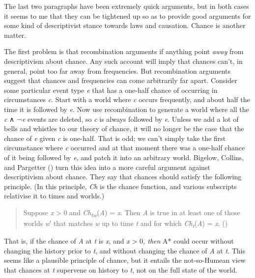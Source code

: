 \documentclass[
  11pt,
  letterpaper,
  DIV=11,
  numbers=noendperiod,
  twoside]{scrartcl}
\begin{document}
The last two paragraphs have been extremely quick arguments, but in both
cases it seems to me that they can be tightened up so as to provide good
arguments for some kind of descriptivist stance towards laws and
causation. Chance is another matter.

The first problem is that recombination arguments if anything point
\emph{away} from descriptivism about chance. Any such account will imply
that chances can't, in general, point too far away from frequencies. But
recombination arguments suggest that chances and frequencies can come
arbitrarily far apart. Consider some particular event type \emph{e} that
has a one-half chance of occurring in circumstances \emph{c}. Start with
a world where \emph{c} occurs frequently, and about half the time it is
followed by \emph{e}. Now use recombination to generate a world where
all the \emph{c} ∧ ¬\emph{e} events are deleted, so \emph{c} is always
followed by \emph{e}. Unless we add a lot of bells and whistles to our
theory of chance, it will no longer be the case that the chance of
\emph{e} given \emph{c} is one-half. That is odd; we can't simply take
the first circumstance where \emph{c} occurred and at that moment there
was a one-half chance of it being followed by \emph{e}, and patch it
into an arbitrary world. Bigelow, Collins, and Pargetter
() turn this idea into a
more careful argument against descriptivism about chance. They say that
chances should satisfy the following principle. (In this principle,
\emph{Ch} is the chance function, and various subscripts relativise it
to times and worlds.)

\begin{quote}
Suppose \emph{x} \textgreater{} 0 and
\emph{Ch\textsubscript{tw}}(\emph{A}) = \emph{x}. Then \emph{A} is true
in at least one of those worlds \emph{w}′ that matches \emph{w} up to
time \emph{t} and for which \emph{Ch\textsubscript{t}}(\emph{A}) =
\emph{x}. ()
\end{quote}

That is, if the chance of \emph{A} at \emph{t} is \emph{x}, and \emph{x}
\textgreater{} 0\emph{, then }A* could occur without changing the
history prior to \emph{t}, and without changing the chance of \emph{A}
at \emph{t}. This seems like a plausible principle of chance, but it
entails the not-so-Humean view that chances at \emph{t} supervene on
history to \emph{t}, not on the full state of the world.
\end{document}
